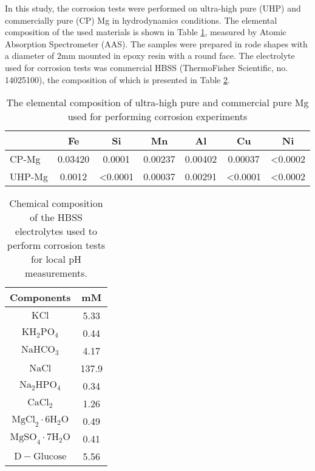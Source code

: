 
In this study, the corrosion tests were performed on ultra-high pure (\gls{UHP}) and commercially pure (\gls{CP}) Mg in hydrodynamics conditions. The elemental composition of the used materials is shown in Table \ref{tab:kinetics_alloys_composition}, measured by Atomic Absorption Spectrometer (AAS). The samples were prepared in rode shapes with a diameter of $2\text{mm}$ mounted in epoxy resin with a round face. The electrolyte used for corrosion tests was commercial \gls{HBSS} (ThermoFisher Scientific, no. 14025100), the composition of which is presented in Table \ref{tab:kinetics_electrolyte_composition}.


\begin{table}[t]
\caption[The elemental composition of highly-pure and commercial-pure Mg]{The elemental composition of ultra-high pure and commercial pure Mg used for performing corrosion experiments}
\medskip
\centering
\begin{tabular}{lcccccc}
\hline & {Fe} & {Si} & {Mn} & {Al} & {Cu} & {Ni} \\
\hline { \gls{CP}-Mg } & 0.03420 & 0.0001 & 0.00237 & 0.00402 & 0.00037 & <0.0002  \\
{ \gls{UHP}-Mg } & 0.0012 & <0.0001 & 0.00037 & 0.00291 & <0.0001 & <0.0002
\end{tabular}
\label{tab:kinetics_alloys_composition}
\end{table}

\begin{table}[h]
\caption[Chemical composition of the HBSS electrolyte]{Chemical composition of the \gls{HBSS} electrolytes used to perform corrosion tests for local pH measurements.}
\medskip
\centering
\begin{tabular}{cc}
\hline
{Components} & {mM} \\
\hline
$\mathrm{KCl}$ & 5.33 \\
$\mathrm{KH}_{2} \mathrm{PO}_{4}$ & 0.44 \\
$\mathrm{NaHCO}_{3}$ & 4.17 \\
$\mathrm{NaCl}$ & 137.9 \\
$\mathrm{Na}_{2} \mathrm{HPO}_{4}$ & 0.34 \\
$\mathrm{CaCl}_{2}$ & 1.26 \\
$\mathrm{MgCl}_{2} \cdot 6 \mathrm{H}_{2} \mathrm{O}$ & 0.49 \\
$\mathrm{MgSO}_{4} \cdot 7 \mathrm{H}_{2} \mathrm{O}$ & 0.41 \\
$\mathrm{D}-\mathrm{Glucose}$ & 5.56 \\
\hline

\end{tabular}
\label{tab:kinetics_electrolyte_composition}
\end{table}

